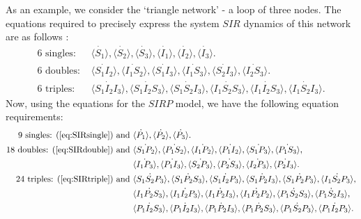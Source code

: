 \documentclass[../report.tex]{subfiles}
\begin{document}
As an example, we consider the `triangle network' - a loop of three nodes. The equations required to precisely express the system $SIR$ dynamics of this network are as follows \cite{kiss_2014}:
\begin{align}
\text{6 singles: } & \dot{\langle S_1 \rangle}, \dot{\langle S_2 \rangle}, \dot{\langle S_3 \rangle}, \dot{\langle I_1 \rangle}, \dot{\langle I_2 \rangle}, \dot{\langle I_3 \rangle}.\label{eq:SIRsingle}\\
\text{6 doubles: } & \dot{\langle S_1 I_2 \rangle},\dot{\langle I_1 S_2 \rangle}, \dot{\langle S_1 I_3 \rangle}, \dot{\langle I_1 S_3 \rangle}, \dot{\langle S_2 I_3\rangle}, \dot{\langle I_2 S_3 \rangle}.\label{eq:SIRdouble}\\
\text{6 triples: } & \dot{\langle S_1 I_2 I_3 \rangle}, \dot{\langle S_1 I_2 S_3 \rangle}, \dot{\langle S_1 S_2 I_3 \rangle}, \dot{\langle I_1 S_2 S_3 \rangle}, \dot{\langle I_1 I_2 S_3 \rangle}, \dot{\langle I_1 S_2 I_3 \rangle}. \label{eq:SIRtriple}
\end{align}
Now, using the equations for the $SIRP$ model, we have the following equation requirements:
\begin{align*}
\text{9 singles: (} \ref{eq:SIRsingle} \text{) and } & \dot{\langle P_1 \rangle}, \dot{\langle P_2 \rangle}, \dot{\langle P_3 \rangle}.\\
\text{18 doubles: (} \ref{eq:SIRdouble} \text{) and }& \dot{\langle S_1 P_2 \rangle},\dot{\langle P_1 S_2 \rangle}, \dot{\langle I_1 P_2 \rangle}, \dot{\langle P_1 I_2 \rangle}, \dot{\langle S_1 P_3\rangle}, \dot{\langle P_1 S_3 \rangle},\\ & \dot{\langle I_1 P_3 \rangle}, \dot{\langle P_1 I_3 \rangle}, \dot{\langle S_2 P_3 \rangle}, \dot{\langle P_2 S_3 \rangle}, \dot{\langle I_2 P_3 \rangle}, \dot{\langle P_2 I_3 \rangle}. \\
\text{24 triples: (} \ref{eq:SIRtriple} \text{) and } & \dot{\langle S_1 S_2 P_3 \rangle}, \dot{\langle S_1 P_2 S_3 \rangle}, \dot{\langle S_1 I_2 P_3\rangle}, \dot{\langle S_1 P_2 I_3 \rangle}, \dot{\langle S_1 P_2 P_3\rangle}, \dot{\langle I_1 S_2 P_3 \rangle},\\
&  \dot{\langle I_1 P_2 S_3 \rangle}, \dot{\langle I_1 I_2 P_3 \rangle}, \dot{\langle I_1 P_2 I_3 \rangle}, \dot{\langle I_1 P_2 P_2 \rangle},  \dot{\langle P_1 S_2 S_3 \rangle}, \dot{\langle P_1 S_2 I_3 \rangle},\\
&  \dot{\langle P_1 I_2 S_3 \rangle}, \dot{\langle P_1 I_2 I_3 \rangle}, \dot{\langle P_1 P_2 I_3 \rangle},  \dot{\langle P_1 P_2 S_3 \rangle}, \dot{\langle P_1 S_2 P_3 \rangle},  \dot{\langle P_1 I_2 P_3\rangle}.
\end{align*}
\end{document}
